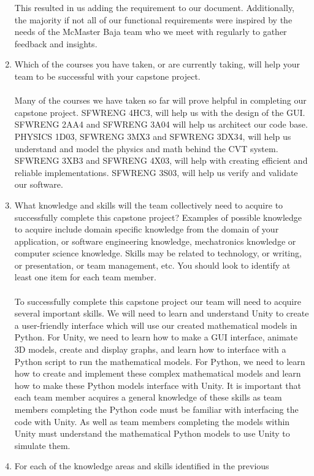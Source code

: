 \documentclass[12pt]{article}
\begin{document}
\begin{enumerate}
  This resulted  in us adding the requirement to our document.
  Additionally, the majority if not all of our functional requirements were inspired by the needs of the McMaster Baja team who we meet with regularly to gather feedback and insights.
  \item Which of the courses you have taken, or are currently taking, will help
  your team to be successful with your capstone project.
  \\\\
  Many of the courses we have taken so far will prove helpful in completing our capstone project.
  SFWRENG 4HC3, will help us with the design of the GUI.
  SFWRENG 2AA4 and SFWRENG 3A04 will help us architect our code base.
  PHYSICS 1D03, SFWRENG 3MX3 and SFWRENG 3DX34, will help us understand and model the physics and math behind the CVT system.
  SFWRENG 3XB3 and SFWRENG 4X03, will help with creating efficient and reliable implementations.
  SFWRENG 3S03, will help us verify and validate our software.
  \item What knowledge and skills will the team collectively need to acquire to
  successfully complete this capstone project?  Examples of possible knowledge
  to acquire include domain specific knowledge from the domain of your
  application, or software engineering knowledge, mechatronics knowledge or
  computer science knowledge.  Skills may be related to technology, or writing,
  or presentation, or team management, etc.  You should look to identify at
  least one item for each team member.
  \\\\
  To successfully complete this capstone project our team will need to acquire several important skills.
  We will need to learn and understand Unity to create a user-friendly interface which will use our created mathematical models in Python.
  For Unity, we need to learn how to make a GUI interface, animate 3D models, create and display graphs, and learn how to interface with a Python script to run the mathematical models.
  For Python, we need to learn how to create and implement these complex mathematical models and learn how to make these Python models interface with Unity.
  It is important that each team member acquires a general knowledge of these skills as team members completing the Python code must be familiar with interfacing the code with Unity. 
  As well as team members completing the models within Unity must understand the mathematical Python models to use Unity to simulate them. 
  \item For each of the knowledge areas and skills identified in the previous

\end{enumerate}
\end{document}
